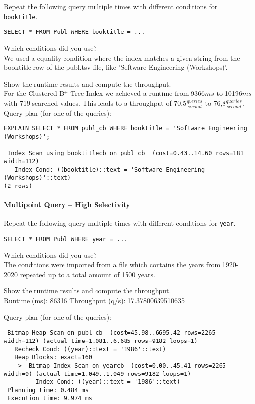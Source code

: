 \documentclass[11pt]{scrartcl}
\begin{document}
Repeat the following query multiple times with different conditions for {\tt booktitle}.

{\small
\begin{verbatim}
SELECT * FROM Publ WHERE booktitle = ...
\end{verbatim}
}

\noindent
Which conditions did you use?\\
We used a equality condition where the index matches a given string from the booktitle row of the publ.tsv file, like 'Software Engineering (Workshops)'.

\smallskip\noindent
Show the runtime results and compute the throughput.\\
For the Clustered B$^+$-Tree Index we achieved a runtime from 9366$ms$ to 10196$ms$ with 719 searched values.
This leads to a throughput of 70,5$\frac{queries}{second}$ to 76,8$\frac{queries}{second}$.\\
\newpage
Query plan (for one of the queries):
\begin{verbatim}
EXPLAIN SELECT * FROM publ_cb WHERE booktitle = 'Software Engineering (Workshops)';

 Index Scan using booktitlecb on publ_cb  (cost=0.43..14.60 rows=181 width=112)
   Index Cond: ((booktitle)::text = 'Software Engineering (Workshops)'::text)
(2 rows)
\end{verbatim}

\paragraph{Multipoint Query -- High Selectivity}

Repeat the following query multiple times with different conditions for {\tt year}.

{\small
\begin{verbatim}
SELECT * FROM Publ WHERE year = ...
\end{verbatim}
}

\noindent
Which conditions did you use?\\
The conditions were imported from a file which contains the years from 1920-2020 repeated up to a total amount of 1500 years.

\smallskip\noindent
Show the runtime results and compute the throughput.\\
Runtime (ms): 86316
Throughput (q/s): 17.37800639510635

\smallskip\noindent
Query plan (for one of the queries):
{\small
\begin{verbatim}
 Bitmap Heap Scan on publ_cb  (cost=45.98..6695.42 rows=2265 width=112) (actual time=1.081..6.685 rows=9182 loops=1)
   Recheck Cond: ((year)::text = '1986'::text)
   Heap Blocks: exact=160
   ->  Bitmap Index Scan on yearcb  (cost=0.00..45.41 rows=2265 width=0) (actual time=1.049..1.049 rows=9182 loops=1)
         Index Cond: ((year)::text = '1986'::text)
 Planning time: 0.484 ms
 Execution time: 9.974 ms
\end{verbatim}
}
\end{document}
